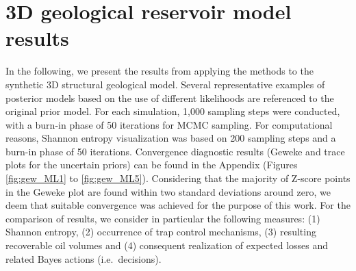 		\section{3D geological reservoir model results}
		In the following, we present the results from applying the methods to the synthetic 3D structural geological model. Several representative examples of posterior models based on the use of different likelihoods are referenced to the original prior model. For each simulation, 1,000 sampling steps were conducted, with a burn-in phase of 50 iterations for MCMC sampling. For computational reasons, Shannon entropy visualization was based on 200 sampling steps and a burn-in phase of 50 iterations. Convergence diagnostic results (Geweke and trace plots for the uncertain priors) can be found in the Appendix (Figures \ref{fig:gew_ML1} to \ref{fig:gew_ML5}). Considering that the majority of Z-score points in the Geweke plot are found within two standard deviations around zero, we deem that suitable convergence was achieved for the purpose of this work. For the comparison of results, we consider in particular the following measures: (1) Shannon entropy, (2) occurrence of trap control mechanisms, (3) resulting recoverable oil volumes and (4) consequent realization of expected losses and related Bayes actions (i.e.\ decisions).
		
